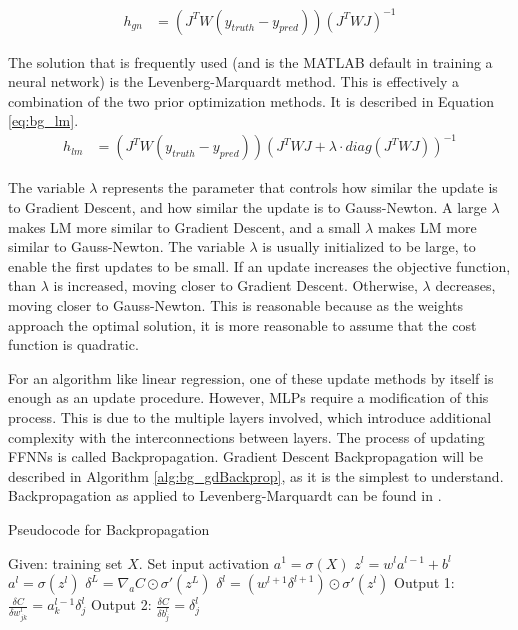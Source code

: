 	\begin{align}
		h_{gn} &= (J^TW(y_{truth}-y_{pred}))(J^T WJ)^{-1} \label{eq:bg_gaussNewton}
	\end{align}
	\par The solution that is frequently used (and is the MATLAB default in training a neural network) is the Levenberg-Marquardt method\cite{lm_alg}. This is effectively a combination of the two prior optimization methods. It is described in Equation \ref{eq:bg_lm}. 
	\begin{align}
		h_{lm} &= (J^TW(y_{truth}-y_{pred}))(J^T WJ + \lambda \cdot diag(J^T WJ))^{-1} \label{eq:bg_lm}
	\end{align}
	\par The variable $\lambda$ represents the parameter that controls how similar the update is to Gradient Descent, and how similar the update is to Gauss-Newton. A large $\lambda$ makes LM more similar to Gradient Descent, and a small $\lambda$ makes LM more similar to Gauss-Newton. The variable $\lambda$ is usually initialized to be large, to enable the first updates to be small. If an update increases the objective function, than $\lambda$ is increased, moving closer to Gradient Descent. Otherwise, $\lambda$ decreases, moving closer to Gauss-Newton. This is reasonable because as the weights approach the optimal solution, it is more reasonable to assume that the cost function is quadratic.
	\par For an algorithm like linear regression, one of these update methods by itself is enough as an update procedure. However, MLPs require a modification of this process. This is due to the multiple layers involved, which introduce additional complexity with the interconnections between layers. The process of updating FFNNs is called Backpropagation. Gradient Descent Backpropagation will be described in Algorithm \ref{alg:bg_gdBackprop}, as it is the simplest to understand. Backpropagation as applied to Levenberg-Marquardt can be found in \cite{placeholderCitation}.
	\begin{algorithm}
		\caption{Pseudocode for Backpropagation}
		\label{alg:bg_gdBackprop}
		\begin{algorithmic}[1]
			\State Given: training set $X$.
			\State Set input activation $a^1=\sigma(X)$
			\State $z^l = w^l a^{l-1} +b^l$
			\State $a^l = \sigma(z^l)$ 
			\EndFor
			\State $\delta^L = \nabla_a C \odot \sigma '(z^L)$
			\State $\delta^l = (w^{l+1}\delta^{l+1}) \odot \sigma '(z^l)$
			\EndFor
			\State Output 1: $\frac{\delta C}{\delta w^{l}_{jk}} = a^{l-1}_{k}\delta^{l}_{j}$
			\State Output 2: $\frac{\delta C}{\delta b^{l}_{j}} = \delta^{l}_{j}$
			\EndProcedure
		\end{algorithmic}
	\end{algorithm}
